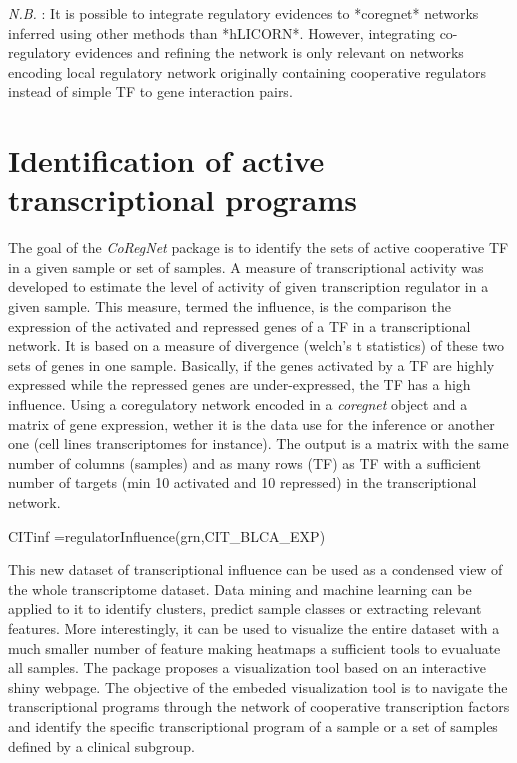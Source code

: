 \documentclass[12pt]{article}
\begin{document}
\textit{N.B.} : It is possible to integrate regulatory evidences to *coregnet*
networks inferred using other methods than *hLICORN*. However,
integrating co-regulatory evidences and refining the network is only
relevant on networks encoding local regulatory network originally
containing cooperative regulators instead of simple TF to gene
interaction pairs.

\section{Identification of active transcriptional programs}

The goal of the \textit{CoRegNet} package is to identify the sets of active
cooperative TF in a given sample or set of samples. A measure of
transcriptional activity was developed to estimate the level of activity
of given transcription regulator in a given sample. This measure, termed
the influence, is the comparison the expression of the activated and
repressed genes of a TF in a transcriptional network. It is based on a
measure of divergence (welch's t statistics) of these two sets of genes
in one sample. Basically, if the genes activated by a TF are highly
expressed while the repressed genes are under-expressed, the TF has a
high influence. Using a coregulatory network encoded in a \textit{coregnet}
object and a matrix of gene expression, wether it is the data use for
the inference or another one (cell lines transcriptomes for instance).
The output is a matrix with the same number of columns (samples) and as
many rows (TF) as TF with a sufficient number of targets (min 10
activated and 10 repressed) in the transcriptional network.

\begin{Schunk}
\begin{Sinput}
    CITinf =regulatorInfluence(grn,CIT_BLCA_EXP)
\end{Sinput}
\end{Schunk}


    This new dataset of transcriptional influence can be used as a condensed
view of the whole transcriptome dataset. Data mining and machine
learning can be applied to it to identify clusters, predict sample
classes or extracting relevant features. More interestingly, it can be
used to visualize the entire dataset with a much smaller number of
feature making heatmaps a sufficient tools to evualuate all samples. The
package proposes a visualization tool based on an interactive shiny
webpage. The objective of the embeded visualization tool is to navigate
the transcriptional programs through the network of cooperative
transcription factors and identify the specific transcriptional program
of a sample or a set of samples defined by a clinical subgroup.
\end{document}
